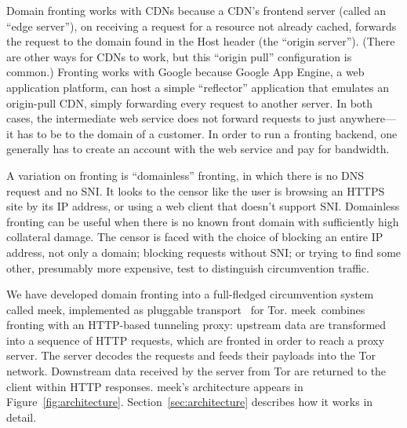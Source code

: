 \documentclass[conference]{IEEEtran}
\newcommand{\meek}{meek\xspace}
\begin{document}
Domain fronting works with CDNs because a CDN's frontend server
(called an ``edge server''),
on receiving a request for a resource not already cached,
forwards the request to the domain found in the Host header
(the ``origin server'').
(There are other ways for CDNs to work, but this ``origin pull''
configuration is common.)
Fronting works with Google because Google App Engine, a web application platform,
can host a simple ``reflector'' application that emulates
an origin-pull CDN, simply forwarding every request to another server.
In both cases, the intermediate web service does not forward requests to just anywhere---it
has to be to the domain of a customer.
In order to run a fronting backend,
one generally has to create an account with the web service and pay for bandwidth.

A variation on fronting is ``domainless'' fronting,
in which there is no DNS request and no SNI.
It looks to the censor
like the user is browsing an HTTPS site by its IP address,
or using a web client that doesn't support SNI.
Domainless fronting can be useful when there is no known front domain
with sufficiently high collateral damage.
The censor is faced with the choice of blocking an entire IP address, not only a domain;
blocking requests without SNI;
or trying to find some other, presumably more expensive, test to distinguish
circumvention traffic.

We have developed domain fronting into a full-fledged circumvention system called \meek,
implemented as pluggable transport~\cite{pt} for Tor.
\meek\ combines fronting with an HTTP-based tunneling proxy:
upstream data are transformed into a sequence of HTTP requests,
which are fronted in order to reach a proxy server.
The server decodes the requests and feeds their payloads
into the Tor network.
Downstream data received by the server from Tor
are returned to the client within HTTP responses.
\meek's architecture appears in Figure~\ref{fig:architecture}.
Section~\ref{sec:architecture} describes how it works in detail.
\end{document}
